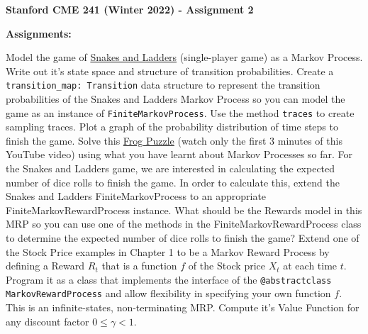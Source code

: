 \documentclass[12pt]{exam}
\begin{document}
\begin{center}
{\large {\bf Stanford CME 241 (Winter 2022) - Assignment 2}}
\end{center}
 
{\large{\bf Assignments:}}
\begin{questions}
\question Model the game of \href{https://toytheater.com/snakes-and-ladders/}{Snakes and Ladders} (single-player game) as a Markov Process. Write out it's state space and structure of transition probabilities.
\question Create a \lstinline{transition_map: Transition} data structure to represent the transition probabilities of the Snakes and Ladders Markov Process so you can model the game as an instance of \lstinline{FiniteMarkovProcess}. Use the method \lstinline{traces} to create sampling traces. Plot a graph of the probability distribution of time steps to finish the game.
\question Solve this \href{https://www.youtube.com/watch?v=ZLTyX4zL2Fc}{Frog Puzzle} (watch only the first 3 minutes of this YouTube video) using what you have learnt about Markov Processes so far.
\question For the Snakes and Ladders game, we are interested in calculating the expected number of dice rolls to finish the game. In order to calculate this, extend the Snakes and Ladders FiniteMarkovProcess to an appropriate FiniteMarkovRewardProcess instance. What should be the Rewards model in this MRP so you can use one of the methods in the FiniteMarkovRewardProcess class to determine the expected number of dice rolls to finish the game?
 Extend one of the Stock Price examples in Chapter 1 to be a Markov Reward Process by defining a Reward $R_t$ that is a function $f$ of the Stock price $X_t$ at each time $t$. Program it as a class that implements the interface of the \lstinline{@abstractclass MarkovRewardProcess} and allow flexibility in specifying your own function $f$. This is an infinite-states, non-terminating MRP. Compute it's Value Function for any discount factor $0 \leq \gamma < 1$.
\end{questions}
\end{document}
